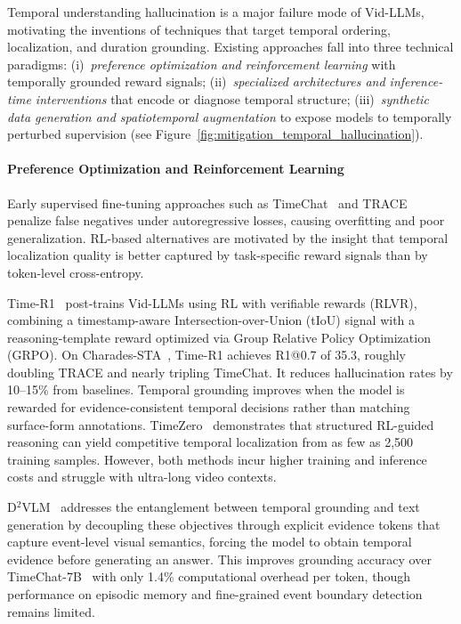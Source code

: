 \documentclass[10pt]{article} %
\begin{document}
Temporal understanding hallucination is a major failure mode of Vid-LLMs, motivating the inventions of techniques that target temporal ordering, localization, and duration grounding. Existing approaches fall into three technical paradigms: (i)~\emph{preference optimization and reinforcement learning} with temporally grounded reward signals; (ii)~\emph{specialized architectures and inference-time interventions} that encode or diagnose temporal structure; (iii)~\emph{synthetic data generation and spatiotemporal augmentation} to expose models to temporally perturbed supervision (see Figure~\ref{fig:mitigation_temporal_hallucination}).

\paragraph{Preference Optimization and Reinforcement Learning}

Early supervised fine-tuning approaches such as TimeChat~\citep{Ren2023TimeChatAT} and TRACE~\citep{Guo2024TRACETG} penalize false negatives under autoregressive losses, causing overfitting and poor generalization. RL-based alternatives are motivated by the insight that temporal localization quality is better captured by task-specific reward signals than by token-level cross-entropy.

Time-R1~\citep{Wang2025TimeR1PL} post-trains Vid-LLMs using RL with verifiable rewards (RLVR), combining a timestamp-aware Intersection-over-Union (tIoU) signal with a reasoning-template reward optimized via Group Relative Policy Optimization (GRPO). On Charades-STA~\citep{gao2017tall}, Time-R1 achieves R1@0.7 of 35.3, roughly doubling TRACE and nearly tripling TimeChat. It reduces hallucination rates by 10--15\% from baselines. Temporal grounding improves when the model is rewarded for evidence-consistent temporal decisions rather than matching surface-form annotations. TimeZero~\citep{Wang2025TimeZeroTV} demonstrates that structured RL-guided reasoning can yield competitive temporal localization from as few as 2,500 training samples. However, both methods incur higher training and inference costs and struggle with ultra-long video contexts.

D$^2$VLM~\citep{Zeng2025FactorizedLF} addresses the entanglement between temporal grounding and text generation by decoupling these objectives through explicit evidence tokens that capture event-level visual semantics, forcing the model to obtain temporal evidence before generating an answer. This improves grounding accuracy over TimeChat-7B~\citep{ren2024timechat} with only 1.4\% computational overhead per token, though performance on episodic memory and fine-grained event boundary detection remains limited.
\end{document}
